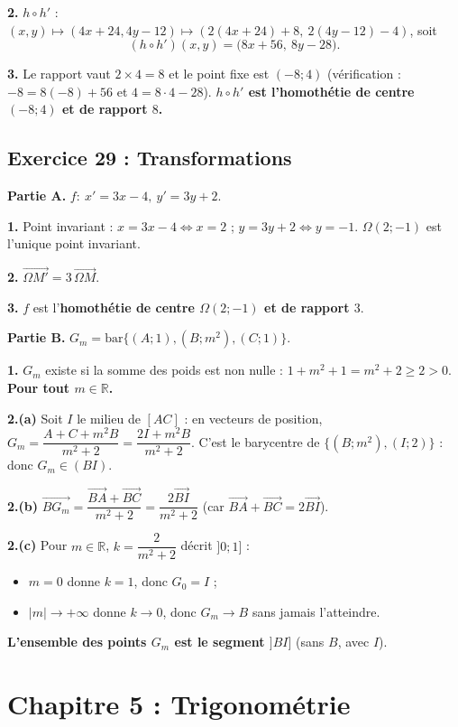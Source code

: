 \documentclass[11pt,a4paper]{article}
\newcommand{\vect}[1]{\overrightarrow{#1}}
\newcommand{\R}{\mathbb{R}}
\begin{document}
\textbf{2.} $h\circ h'$ : $(x,y)\mapsto(4x+24,4y-12)\mapsto(2(4x+24)+8,\ 2(4y-12)-4)$, soit
\[
(h\circ h')(x,y)=\bigl(8x+56,\ 8y-28\bigr).
\]

\textbf{3.} Le rapport vaut $2\times4=8$ et le point fixe est $(-8;4)$ (v\'erification : $-8=8(-8)+56$ et $4=8\cdot4-28$).
\textbf{$h\circ h'$ est l'homoth\'etie de centre $(-8;4)$ et de rapport $8$.}

\subsection{Exercice 29 : Transformations}

\textbf{Partie A.} $f:\ x'=3x-4,\ y'=3y+2$.

\textbf{1.} Point invariant : $x=3x-4\iff x=2$ ; $y=3y+2\iff y=-1$. \textbf{$\Omega(2;-1)$} est l'unique point invariant.

\textbf{2.} $\vect{\Omega M'}=3\,\vect{\Omega M}$.

\textbf{3.} $f$ est l'\textbf{homoth\'etie de centre $\Omega(2;-1)$ et de rapport $3$}.

\textbf{Partie B.} $G_m=\mathrm{bar}\{(A;1),(B;m^2),(C;1)\}$.

\textbf{1.} $G_m$ existe si la somme des poids est non nulle : $1+m^2+1=m^2+2\ge2>0$. \textbf{Pour tout $m\in\R$.}

\textbf{2.(a)} Soit $I$ le milieu de $[AC]$ : en vecteurs de position, $G_m=\dfrac{A+C+m^2B}{m^2+2}=\dfrac{2I+m^2B}{m^2+2}$.
C'est le barycentre de $\{(B;m^2),(I;2)\}$ : donc $G_m\in(BI)$.

\textbf{2.(b)} $\vect{BG_m}=\dfrac{\vect{BA}+\vect{BC}}{m^2+2}=\dfrac{2\vect{BI}}{m^2+2}$ (car $\vect{BA}+\vect{BC}=2\vect{BI}$).

\textbf{2.(c)} Pour $m\in\R$, $k=\dfrac{2}{m^2+2}$ d\'ecrit $]0;1]$ :
\begin{itemize}
  \item $m=0$ donne $k=1$, donc $G_0=I$ ;
  \item $|m|\to+\infty$ donne $k\to0$, donc $G_m\to B$ sans jamais l'atteindre.
\end{itemize}
\textbf{L'ensemble des points $G_m$ est le segment $]BI]$} (sans $B$, avec $I$).

\section{Chapitre 5 : Trigonom\'etrie}
\end{document}
